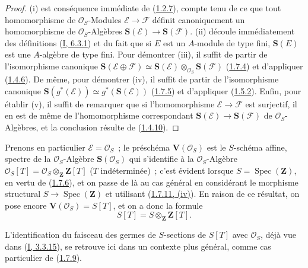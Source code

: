 \begin{proof}
(i) est conséquence immédiate de
(\hyperref[II.1.2.7-fr]{1.2.7}), compte tenu de ce que tout homomorphisme de
$\mathcal{O}_S$-Modules $\mathcal{E}\to\mathcal{F}$ définit canoniquement un
homomorphisme de $\mathcal{O}_S$-Algèbres
$\mathbf{S}(\mathcal{E})\to\mathbf{S}(\mathcal{F})$. (ii) découle
immédiatement des définitions (\hyperref[I.6.3.1-fr]{I, 6.3.1}) et du fait
que si $E$ est un $A$-module de type fini, $\mathbf{S}(E)$ est une
$A$-algèbre de type fini. Pour démontrer (iii), il suffit de partir de
l'isomorphisme canonique
$\mathbf{S}(\mathcal{E}\oplus\mathcal{F})
\simeq\mathbf{S}(\mathcal{E})
\otimes_{\mathcal{O}_S}\mathbf{S}(\mathcal{F})$
(\hyperref[II.1.7.4-fr]{1.7.4}) et d'appliquer
(\hyperref[II.1.4.6-fr]{1.4.6}). De même, pour démontrer (iv), il suffit de
partir de l'isomorphisme canonique
$\mathbf{S}(g^*(\mathcal{E}))
\simeq g^*(\mathbf{S}(\mathcal{E}))$
(\hyperref[II.1.7.5-fr]{1.7.5}) et d'appliquer
(\hyperref[II.1.5.2-fr]{1.5.2}). Enfin, pour établir (v), il suffit de
remarquer que si l'homomorphisme $\mathcal{E}\to\mathcal{F}$ est surjectif,
il en est de même de l'homomorphisme correspondant
$\mathbf{S}(\mathcal{E})\to\mathbf{S}(\mathcal{F})$ de
$\mathcal{O}_S$-Algèbres, et la conclusion résulte de
(\hyperref[II.1.4.10-fr]{1.4.10}).
\end{proof}

\begin{env}[1.7.12]
\label{II.1.7.12-fr}
Prenons en particulier $\mathcal{E}=\mathcal{O}_S$~; le préschéma
$\mathbf{V}(\mathcal{O}_S)$ est le $S$-schéma affine, spectre de la
$\mathcal{O}_S$-Algèbre $\mathbf{S}(\mathcal{O}_S)$ qui s'identifie à la
$\mathcal{O}_S$-Algèbre
$\mathcal{O}_S[T]=\mathcal{O}_S\otimes_{\mathbf{Z}}\mathbf{Z}[T]$
($T$ indéterminée)~; c'est évident lorsque
$S=\operatorname{Spec}(\mathbf{Z})$, en vertu de
(\hyperref[II.1.7.6-fr]{1.7.6}), et on passe de là au cas général en
considérant le morphisme structural
$S\to\operatorname{Spec}(\mathbf{Z})$ et utilisant
(\hyperref[II.1.7.11-fr]{1.7.11, (iv)}). En raison de ce résultat, on pose
encore $\mathbf{V}(\mathcal{O}_S)=S[T]$, et on a donc la formule
\[
  S[T]=S\otimes_{\mathbf{Z}}\mathbf{Z}[T].
  \tag{1.7.12.1}\label{II.1.7.12.1-fr}
\]

L'identification du faisceau des germes de $S$-sections de $S[T]$ avec
$\mathcal{O}_S$, déjà vue dans
(\hyperref[I.3.3.15-fr]{I, 3.3.15}), se retrouve ici dans un contexte plus
général, comme cas particulier de (\hyperref[II.1.7.9-fr]{1.7.9}).
\end{env}

